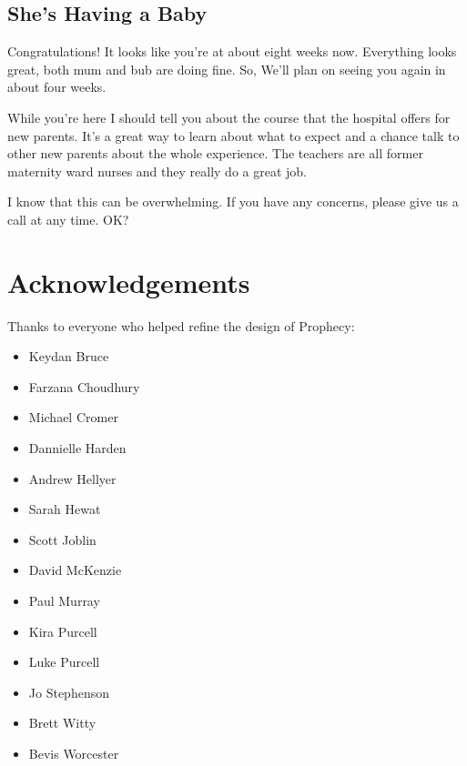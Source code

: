 \documentclass[12pt, a5paper, parskip=half-]{scrartcl}
\begin{document}
\subsection*{She's Having a Baby}
Congratulations! It looks like you're at about eight weeks now.
Everything looks great, both mum and bub are doing fine. 
So, We'll plan on seeing you again in about four weeks.

While you're here I should tell you about the course that the hospital offers for new parents.
It's a great way to learn about what to expect and a chance talk to other new parents about the whole experience. 
The teachers are all former maternity ward nurses and they really do a great job.

I know that this can be overwhelming.
If you have any concerns, please give us a call at any time. 
OK?

\newpage

\section*{Acknowledgements}
Thanks to everyone who helped refine the design of Prophecy:
\begin{multicols}{2}
\begin{itemize}
  \item Keydan Bruce
  \item Farzana Choudhury
  \item Michael Cromer
  \item Dannielle Harden
  \item Andrew Hellyer
  \item Sarah Hewat
  \item Scott Joblin
  \item David McKenzie
  \item Paul Murray
  \item Kira Purcell
  \item Luke Purcell
  \item Jo Stephenson
  \item Brett Witty
  \item Bevis Worcester
  
\end{itemize}
\end{multicols}
\end{document}
